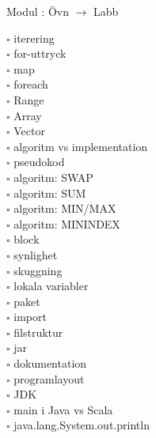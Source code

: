 
    Modul : Övn  $\rightarrow$ Labb \Alert{\texttt{--}}
    \begin{multicols}{3}\SlideFontTiny
    $\square$ iterering \\
$\square$ for-uttryck \\
$\square$ map \\
$\square$ foreach \\
$\square$ Range \\
$\square$ Array \\
$\square$ Vector \\
$\square$ algoritm vs implementation \\
$\square$ pseudokod \\
$\square$ algoritm: SWAP \\
$\square$ algoritm: SUM \\
$\square$ algoritm: MIN/MAX \\
$\square$ algoritm: MININDEX \\
$\square$ block \\
$\square$ synlighet \\
$\square$ skuggning \\
$\square$ lokala variabler \\
$\square$ paket \\
$\square$ import \\
$\square$ filstruktur \\
$\square$ jar \\
$\square$ dokumentation \\
$\square$ programlayout \\
$\square$ JDK \\
$\square$ main i Java vs Scala \\
$\square$ java.lang.System.out.println \\
    \end{multicols}
    